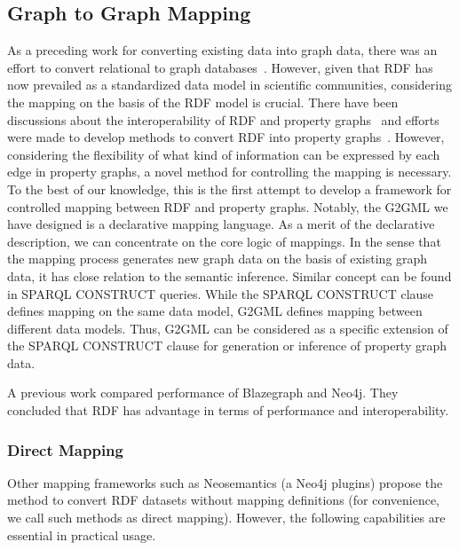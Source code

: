 \documentclass[runningheads]{llncs}
\begin{document}
\subsection{Graph to Graph Mapping}
As a preceding work for converting existing data into graph data, there was an effort to convert relational to graph databases~\cite{virgilio1}. 
However, given that RDF has now prevailed as a standardized data model in scientific communities, considering the mapping on the basis of the RDF model is crucial. There have been discussions about the interoperability of RDF and property graphs~\cite{hartig,angles4,das,thakkar} and efforts were made to develop methods to convert RDF into property graphs~\cite{tomaszuk1,virgilio}. However, considering the flexibility of what kind of information can be expressed by each edge in property graphs, a novel method for controlling the mapping is necessary.
To the best of our knowledge, this is the first attempt to develop a framework for controlled mapping between RDF and property graphs. 
Notably, the G2GML we have designed is a declarative mapping language. 
As a merit of the declarative description, we can concentrate on the core logic of mappings. In the sense that the mapping process generates new graph data on the basis of existing graph data, it has close relation to the semantic inference. Similar concept can be found in SPARQL CONSTRUCT queries. While the SPARQL CONSTRUCT clause defines mapping on the same data model, G2GML defines mapping between different data models. 
Thus, G2GML can be considered as a specific extension of the SPARQL CONSTRUCT clause for generation or inference of property graph data.

A previous work compared performance of Blazegraph and Neo4j. They concluded that RDF has advantage in terms of performance and interoperability.


\subsubsection{Direct Mapping}

Other mapping frameworks such as Neosemantics (a Neo4j plugins) propose the method to convert RDF datasets without mapping definitions (for convenience, we call such methods as direct mapping). However, the following capabilities are essential in practical usage.
\end{document}

